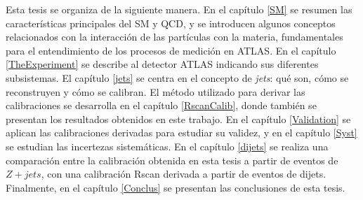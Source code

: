 Esta tesis se organiza de la siguiente manera. En el capítulo \ref{SM} se resumen las características principales del SM y QCD, y se introducen algunos conceptos relacionados con la interacción de las partículas con la materia, fundamentales para el entendimiento de los procesos de medición en ATLAS. En el capítulo \ref{TheExperiment} se describe al detector ATLAS indicando sus diferentes subsistemas. El capítulo \ref{jets} se centra en el concepto de \textit{jets}: qué son, cómo se reconstruyen y cómo se calibran. El método utilizado para derivar las calibraciones se desarrolla en el capítulo \ref{RscanCalib}, donde también se presentan los resultados obtenidos en este trabajo. En el capítulo \ref{Validation} se aplican las calibraciones derivadas para estudiar su validez, y en el capítulo \ref{Syst} se estudian las incertezas sistemáticas. En el capítulo \ref{dijets} se realiza una comparación entre la calibración obtenida en esta tesis a partir de eventos de $Z+jets$, con una calibración Rscan derivada a partir de eventos de dijets. Finalmente, en el capítulo \ref{Conclus} se presentan las conclusiones de esta tesis.
